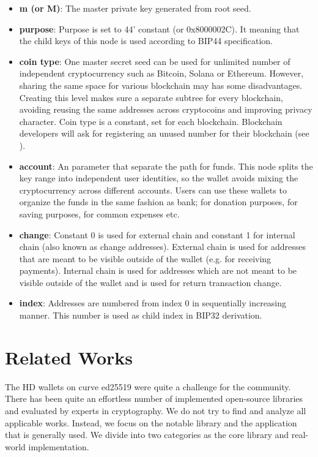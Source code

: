 \begin{itemize}
    \item \textbf{m (or M)}: The master private key generated from root seed.
    \item \textbf{purpose}: Purpose is set to 44' constant (or 0x8000002C). It meaning that the child keys of this node is used according to BIP44 specification.
    \item \textbf{coin type}: One master secret seed can be used for unlimited number of independent cryptocurrency such as Bitcoin, Solana or Ethereum. However, sharing the same space for various blockchain may has some disadvantages. Creating this level makes sure a separate subtree for every blockchain, avoiding reusing the same addresses across cryptocoins and improving privacy character. Coin type is a constant, set for each blockchain. Blockchain developers will ask for registering an unused number for their blockchain (see \cite{bip44}).
    \item \textbf{account}: An parameter that separate the path for funds. This node splits the key range into independent user identities, so the wallet avoids mixing the cryptocurrency across different accounts. Users can use these wallets to organize the funds in the same fashion as bank; for donation purposes, for saving purposes, for common expenses etc.
    \item \textbf{change}: Constant 0 is used for external chain and constant 1 for internal chain (also known as change addresses). External chain is used for addresses that are meant to be visible outside of the wallet (e.g. for receiving payments). Internal chain is used for addresses which are not meant to be visible outside of the wallet and is used for return transaction change.
    \item \textbf{index}: Addresses are numbered from index 0 in sequentially increasing manner. This number is used as child index in BIP32 derivation.

\end{itemize}


\section{Related Works}
\label{related}

The HD wallets on curve ed25519 were quite a challenge for the community. There has been quite an effortless number of implemented open-source libraries and evaluated by experts in cryptography. We do not try to find and analyze all applicable works. Instead, we focus on the notable library and the application that is generally used. We divide into two categories as the core library and real-world implementation.

